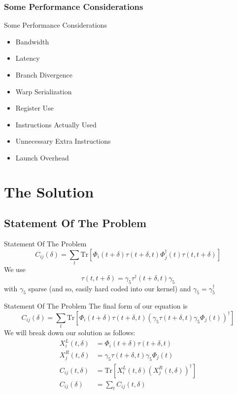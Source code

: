 \documentclass[xcolor=svgnames]{beamer}
\newcommand{\tr}[1]{\textrm{Tr}\left[ #1 \right]}
\begin{document}
\subsubsection{Some Performance Considerations}

\begin{frame}{Some Performance Considerations}
 \begin{itemize}
  \item Bandwidth
  \item Latency
  \item Branch Divergence
  \item Warp Serialization
  \item Register Use
  \item Instructions Actually Used
  \item Unnecessary Extra Instructions
  \item Launch Overhead
 \end{itemize}
\end{frame}

\section{The Solution}
\subsection{Statement Of The Problem}

\begin{frame}{Statement Of The Problem}
\[
C_{ij}(\delta) = \sum_t \tr{\Phi_i(t+\delta) \tau(t+\delta, t) \Phi^\dagger_j(t) \tau(t, t+\delta) }
\]
We use
\[
\tau(t, t+\delta) = \gamma_5 \tau^\dagger(t+\delta, t) \gamma_5
\]
with $\gamma_5$ sparse (and so, easily hard coded into our kernel) and $\gamma_5 = \gamma_5^\dagger$
\end{frame}

\begin{frame}{Statement Of The Problem}
The final form of our equation is
\[
C_{ij}(\delta) = \sum_t \tr{\Phi_i(t+\delta) \tau(t+\delta, t) (\gamma_5 \tau(t+\delta, t) \gamma_5 \Phi_j(t))^\dagger }
\]
We will break down our solution as follows:
\begin{align*}
X_i^L(t, \delta)
	&= \Phi_i(t+\delta) \tau(t+\delta, t)\\
%
X_j^R(t, \delta)
	&= \gamma_5 \tau(t+\delta, t) \gamma_5 \Phi_j(t)\\
%
C_{ij}(t, \delta)
	&= \tr{ X_i^L(t, \delta) (X_j^R(t, \delta))^\dagger }\\
%
C_{ij}(\delta)
	&= \sum_t C_{ij}(t, \delta)
\end{align*}
\end{frame}
\end{document}
